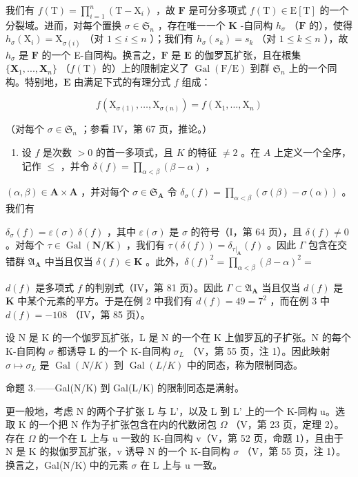 我们有 \(f(\mathrm{T}) = \prod_{i=1}^{n} (\mathrm{T} - \mathrm{X}_i)\) ，故 \(\mathbf{F}\) 是可分多项式 \(f(\mathrm{T}) \in \mathrm{E}[\mathrm{T}]\) 的一个分裂域。进而，对每个置换 \(\sigma \in \mathfrak{S}_n\) ，存在唯一一个 \(\mathbf{K}\) -自同构 \(h_\sigma\) （\(\mathbf{F}\) 的），使得 \(h_\sigma(\mathrm{X}_i) = \mathrm{X}_{\sigma(i)}\) （对 \(1 \leqslant i \leqslant n\) ）；我们有 \(h_\sigma(s_k) = s_k\) （对 \(1 \leqslant k \leqslant n\) ），故 \(h_\sigma\) 是 \(\mathbf{F}\) 的一个 E-自同构。换言之，\(\mathbf{F}\) 是 \(\mathbf{E}\) 的伽罗瓦扩张，且在根集 \(\{\mathbf{X}_1, ..., \mathbf{X}_n\}\) （\(f(\mathrm{T})\) 的）上的限制定义了 \(\operatorname{Gal}(\mathrm{F}/\mathrm{E})\) 到群 \(\mathfrak{S}_n\) 上的一个同构。特别地，\(\mathbf{E}\) 由满足下式的有理分式 \(f\) 组成：

\[
f \left(\mathrm{X} _ {\sigma (1)}, \dots , \mathrm{X} _ {\sigma (n)}\right) = f \left(\mathrm{X} _ {1}, \dots , \mathrm{X} _ {n}\right)
\]

（对每个 \(\sigma \in \mathfrak{S}_n\) ；参看 IV，第 67 页，推论。）

\begin{enumerate}
\def\labelenumi{\arabic{enumi})}
\setcounter{enumi}{5}
\tightlist
\item
  设 \(f\) 是次数 \(> 0\) 的首一多项式，且 \(K\) 的特征 \(\neq 2\) 。在 \(A\) 上定义一个全序，记作 \(\leqslant\) ，并令 \(\delta(f) = \prod_{\alpha < \beta} (\beta - \alpha)\) ，
\end{enumerate}

\((\alpha, \beta) \in \mathbf{A} \times \mathbf{A}\) ，并对每个 \(\sigma \in \mathfrak{S}_{\mathbf{A}}\) 令 \(\delta_{\sigma}(f) = \prod_{\alpha < \beta} (\sigma(\beta) - \sigma(\alpha))\) 。我们有

\(\delta_{\sigma}(f) = \varepsilon(\sigma)\ \delta(f)\) ，其中 \(\varepsilon(\sigma)\) 是 \(\sigma\) 的符号（I，第 64 页），且 \(\delta(f) \neq 0\) 。对每个 \(\tau \in \operatorname{Gal}(\mathbf{N}/\mathbf{K})\) ，我们有 \(\tau(\delta(f)) = \delta_{\tau|_{\mathbf{A}}}(f)\) 。因此 \(\Gamma\) 包含在交错群 \(\mathfrak{A}_{\mathbf{A}}\) 中当且仅当 \(\delta(f) \in \mathbf{K}\) 。此外，\(\delta(f)^2 = \prod_{\alpha < \beta} (\beta - \alpha)^2 =\)

\(d(f)\) 是多项式 \(f\) 的判别式（IV，第 81 页）。因此 \(\Gamma \subset \mathfrak{A}_{\mathbf{A}}\) 当且仅当 \(d(f)\) 是 \(\mathbf{K}\) 中某个元素的平方。于是在例 2 中我们有 \(d(f) = 49 = 7^2\) ，而在例 3 中 \(d(f) = -108\) （IV，第 85 页）。

设 N 是 K 的一个伽罗瓦扩张，L 是 N 的一个在 K 上伽罗瓦的子扩张。N 的每个 K-自同构 \(\sigma\) 都诱导 L 的一个 K-自同构 \(\sigma_{L}\) （V，第 55 页，注 1）。因此映射 \(\sigma \mapsto \sigma_{L}\) 是 \(\operatorname{Gal}(N/K)\) 到 \(\operatorname{Gal}(L/K)\) 中的同态，称为限制同态。

命题 3.——Gal(N/K) 到 Gal(L/K) 的限制同态是满射。

更一般地，考虑 N 的两个子扩张 L 与 L'，以及 L 到 L' 上的一个 K-同构 u。选取 K 的一个把 N 作为子扩张包含在内的代数闭包 \(\Omega\) （V，第 23 页，定理 2）。存在 \(\Omega\) 的一个在 L 上与 u 一致的 K-自同构 v（V，第 52 页，命题 1），且由于 N 是 K 的拟伽罗瓦扩张，v 诱导 N 的一个 K-自同构 \(\sigma\) （V，第 55 页，注 1）。换言之，Gal(N/K) 中的元素 \(\sigma\) 在 L 上与 u 一致。

